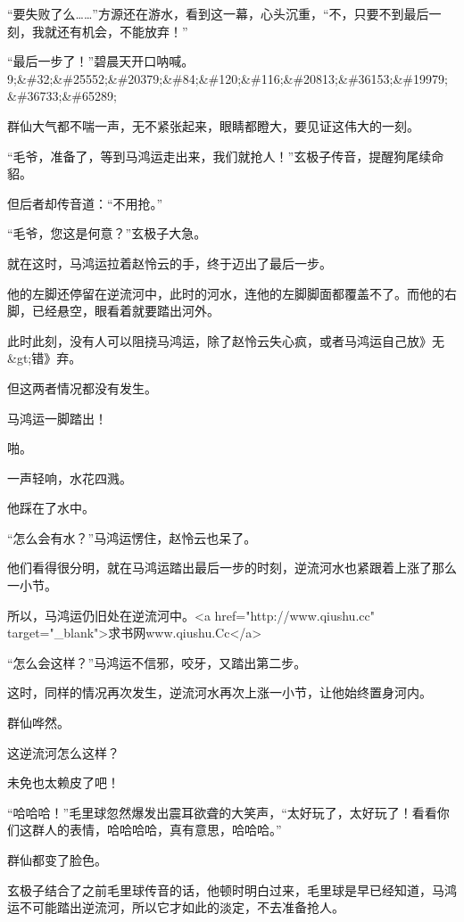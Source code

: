 
\begin{this_body}

“要失败了么……”方源还在游水，看到这一幕，心头沉重，“不，只要不到最后一刻，我就还有机会，不能放弃！”

“最后一步了！”碧晨天开口呐喊。9;\&\#32;\&\#25552;\&\#20379;\&\#84;\&\#120;\&\#116;\&\#20813;\&\#36153;\&\#19979;\&\#36733;\&\#65289;

群仙大气都不喘一声，无不紧张起来，眼睛都瞪大，要见证这伟大的一刻。

“毛爷，准备了，等到马鸿运走出来，我们就抢人！”玄极子传音，提醒狗尾续命貂。

但后者却传音道：“不用抢。”

“毛爷，您这是何意？”玄极子大急。

就在这时，马鸿运拉着赵怜云的手，终于迈出了最后一步。

他的左脚还停留在逆流河中，此时的河水，连他的左脚脚面都覆盖不了。而他的右脚，已经悬空，眼看着就要踏出河外。

此时此刻，没有人可以阻挠马鸿运，除了赵怜云失心疯，或者马鸿运自己放》无\&gt;错》弃。

但这两者情况都没有发生。

马鸿运一脚踏出！

啪。

一声轻响，水花四溅。

他踩在了水中。

“怎么会有水？”马鸿运愣住，赵怜云也呆了。

他们看得很分明，就在马鸿运踏出最后一步的时刻，逆流河水也紧跟着上涨了那么一小节。

所以，马鸿运仍旧处在逆流河中。<a href="http://www.qiushu.cc" target="\_blank">求书网www.qiushu.Cc</a>

“怎么会这样？”马鸿运不信邪，咬牙，又踏出第二步。

这时，同样的情况再次发生，逆流河水再次上涨一小节，让他始终置身河内。

群仙哗然。

这逆流河怎么这样？

未免也太赖皮了吧！

“哈哈哈！”毛里球忽然爆发出震耳欲聋的大笑声，“太好玩了，太好玩了！看看你们这群人的表情，哈哈哈哈，真有意思，哈哈哈。”

群仙都变了脸色。

玄极子结合了之前毛里球传音的话，他顿时明白过来，毛里球是早已经知道，马鸿运不可能踏出逆流河，所以它才如此的淡定，不去准备抢人。


\end{this_body}
